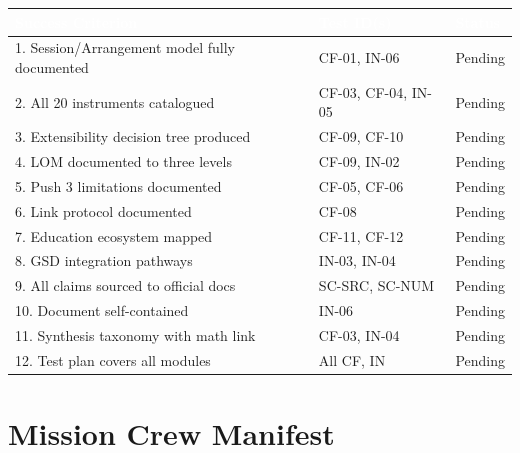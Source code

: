 \documentclass[11pt,letterpaper]{article}
\newcommand{\tableheader}[1]{\textbf{\sffamily\textcolor{white}{#1}}}
\begin{document}
\begin{center}
\begin{tabularx}{\textwidth}{XL{3.5cm}C{1.5cm}}
\toprule
{}
\tableheader{Success Criterion} & \tableheader{Test ID(s)} & \tableheader{Status} \\
. Session/Arrangement model fully documented & CF-01, IN-06 & Pending \\
2. All 20 instruments catalogued & CF-03, CF-04, IN-05 & Pending \\
3. Extensibility decision tree produced & CF-09, CF-10 & Pending \\
4. LOM documented to three levels & CF-09, IN-02 & Pending \\
5. Push 3 limitations documented & CF-05, CF-06 & Pending \\
6. Link protocol documented & CF-08 & Pending \\
7. Education ecosystem mapped & CF-11, CF-12 & Pending \\
8. GSD integration pathways & IN-03, IN-04 & Pending \\
9. All claims sourced to official docs & SC-SRC, SC-NUM & Pending \\
10. Document self-contained & IN-06 & Pending \\
11. Synthesis taxonomy with math link & CF-03, IN-04 & Pending \\
12. Test plan covers all modules & All CF, IN & Pending \\
\bottomrule
\end{tabularx}
\end{center}

\section{Mission Crew Manifest}
\end{document}
